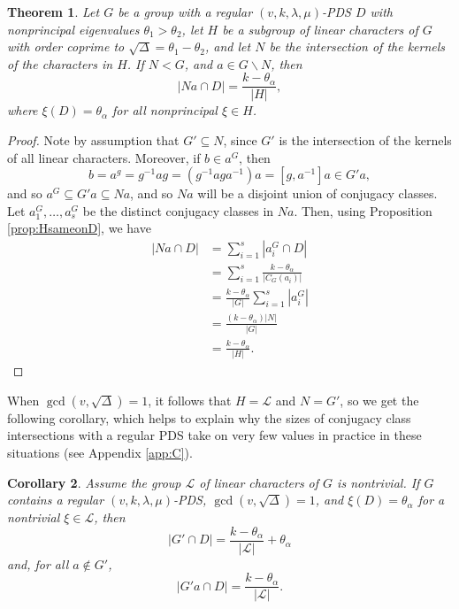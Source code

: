 \documentclass[12pt]{amsproc} %
\newtheorem{thm}{Theorem}[section]
\newtheorem{cor}[thm]{Corollary}
\theoremstyle{definition}\newtheorem{defn}[thm]{Definition}
\theoremstyle{definition}\newtheorem{rem}[thm]{Remark}
\theoremstyle{definition}\newtheorem{ex}[thm]{Example}
\newcommand{\calL}{\mathcal{L}}
\begin{document}
\begin{thm}\label{thm:Ncosetintersection}
        Let $G$ be a group with a regular $(v, k, \lambda, \mu)$-PDS $D$ with nonprincipal eigenvalues $\theta_1 > \theta_2$, let $H$ be a subgroup of linear characters of $G$ with order coprime to $\sqrt{\Delta} = \theta_1 - \theta_2$, and let $N$ be the intersection of the kernels of the characters in $H$.  If $N < G$, and $a \in G \backslash N$, then
                       \[ |Na \cap D| = \frac{k - \theta_\alpha}{|H|},\]
        where $\xi(D) = \theta_\alpha$ for all nonprincipal $\xi \in H$.
\end{thm}
        \begin{proof}
                Note by assumption that $G' \subseteq N$, since $G'$ is the intersection of the kernels of all linear characters. Moreover, if $b \in a^G$, then 
                \[ b = a^g = g^{-1}ag = (g^{-1}aga^{-1})a = [g, a^{-1}]a \in G'a,\]
                and so $a^G \subseteq G'a \subseteq Na$, and so $Na$ will be a disjoint union of conjugacy classes. Let $a_1^G, \dots, a_s^G$ be the distinct conjugacy classes in $Na$. Then, using Proposition \ref{prop:HsameonD}, we have
                \begin{align*}
                    |Na \cap D| &= \sum_{i = 1}^s |a_i^G \cap D|\\
                                &= \sum_{i = 1}^s \frac{k - \theta_\alpha}{|C_G(a_i)|}\\
                                &= \frac{k - \theta_\alpha}{|G|} \sum_{i = 1}^s |a_i^G|\\
                                &= \frac{(k - \theta_\alpha)|N|}{|G|}\\
                                &= \frac{k - \theta_\alpha}{|H|}.
                \end{align*}
        \end{proof}

When $\gcd(v, \sqrt{\Delta}) = 1$, it follows that $H = \calL$ and $N = G'$, so we get the following corollary, which helps to explain why the sizes of conjugacy class intersections with a regular PDS take on very few values in practice in these situations (see Appendix \ref{app:C}).

\begin{cor}
    \label{cor:LsameonD}
    Assume the group $\mathcal{L}$ of linear characters of $G$ is nontrivial.  If $G$ contains a regular $(v,k, \lambda, \mu)$-PDS, $\gcd(v, \sqrt{\Delta}) = 1$, and $\xi(D) = \theta_\alpha$ for a nontrivial $\xi \in \mathcal{L}$, then
    \[ |G' \cap D| = \frac{k - \theta_\alpha}{|\calL|} + \theta_\alpha\]
    and, for all $a \notin G'$,
    \[ |G'a \cap D| = \frac{k - \theta_\alpha}{|\calL|}.\]
\end{cor}
\end{document}
